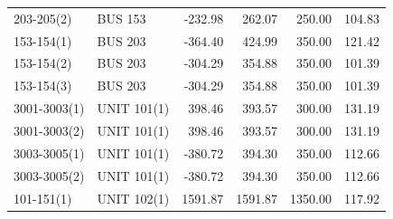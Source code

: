 \documentclass[10pt]{report}
\begin{document}
\begin{table}[H]
{\begin{tabular}{llrrrr}
203-205(2) & BUS 153 & -232.98 & 262.07 & 250.00 & 104.83 \\
153-154(1) & BUS 203 & -364.40 & 424.99 & 350.00 & 121.42 \\
153-154(2) & BUS 203 & -304.29 & 354.88 & 350.00 & 101.39 \\
153-154(3) & BUS 203 & -304.29 & 354.88 & 350.00 & 101.39 \\
3001-3003(1) & UNIT 101(1) & 398.46 & 393.57 & 300.00 & 131.19 \\
3001-3003(2) & UNIT 101(1) & 398.46 & 393.57 & 300.00 & 131.19 \\
3003-3005(1) & UNIT 101(1) & -380.72 & 394.30 & 350.00 & 112.66 \\
3003-3005(2) & UNIT 101(1) & -380.72 & 394.30 & 350.00 & 112.66 \\
101-151(1) & UNIT 102(1) & 1591.87 & 1591.87 & 1350.00 & 117.92 \\
\bottomrule
\end{tabular}}
\end{table}
\end{document}

